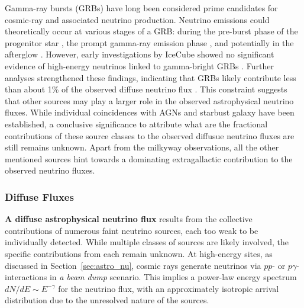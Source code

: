 Gamma-ray bursts (GRBs) have long been considered prime candidates for cosmic-ray and associated neutrino production. Neutrino emissions could theoretically occur at various stages of a GRB: during the pre-burst phase of the progenitor star , the prompt gamma-ray emission phase , and potentially in the afterglow . However, early investigations by IceCube showed no significant evidence of high-energy neutrinos linked to gamma-bright GRBs . Further analyses strengthened these findings, indicating that GRBs likely contribute less than about 1\% of the observed diffuse neutrino flux . This constraint suggests that other sources may play a larger role in the observed astrophysical neutrino fluxes. While individual coincidences with AGNs and starbust galaxy have been established, a conclusive significance to attribute what are the fractional contributions of these source classes to the observed diffusue neutrino fluxes are still remains unknown. Apart from the milkyway observations, all the other mentioned sources hint towards a dominating extragallactic contribution to the observed neutrino fluxes. 

\subsubsection{Diffuse Fluxes}
\label{sec:diffuse_theory}

\textbf{A diffuse astrophysical neutrino flux} results from the collective contributions of numerous faint neutrino sources, each too weak to be individually detected. While multiple classes of sources are likely involved, the specific contributions from each remain unknown. At high-energy sites, as discussed in Section~\ref{sec:astro_nu}, cosmic rays generate neutrinos via \(pp\)- or \(p\gamma\)-interactions in \emph{a beam dump} scenario. This implies a power-law energy spectrum \( dN/dE \sim E^{-\gamma} \) for the neutrino flux, with an approximately isotropic arrival distribution due to the unresolved nature of the sources. 

